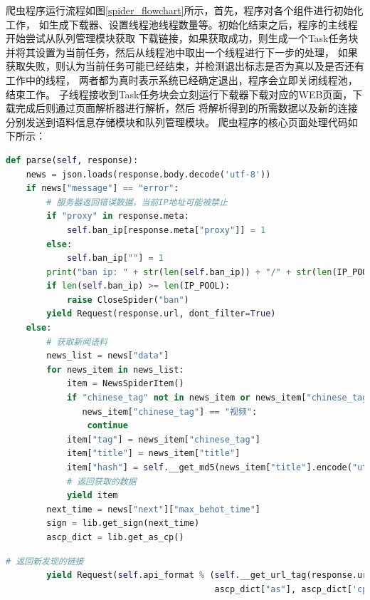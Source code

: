 爬虫程序运行流程如图\ref{spider_flowchart}所示，首先，程序对各个组件进行初始化工作，
如生成下载器、设置线程池线程数量等。初始化结束之后，程序的主线程开始尝试从队列管理模块获取
下载链接，如果获取成功，则生成一个Task任务块并将其设置为当前任务，然后从线程池中取出一个线程进行下一步的处理，
如果获取失败，则认为当前任务可能已经结束，并检测退出标志是否为真以及是否还有工作中的线程，
两者都为真时表示系统已经确定退出，程序会立即关闭线程池，结束工作。
子线程接收到Task任务块会立刻运行下载器下载对应的WEB页面，下载完成后则通过页面解析器进行解析，然后
将解析得到的所需数据以及新的连接分别发送到语料信息存储模块和队列管理模块。
爬虫程序的核心页面处理代码如下所示：
\begin{lstlisting}[language={Python},frame=shadowbox,rulesepcolor=\color{red!0!green!0!blue!0}] 
    def parse(self, response):
    news = json.loads(response.body.decode('utf-8'))
    if news["message"] == "error":
        # 服务器返回错误数据，当前IP地址可能被禁止
        if "proxy" in response.meta:
            self.ban_ip[response.meta["proxy"]] = 1
        else:
            self.ban_ip[""] = 1
        print("ban ip: " + str(len(self.ban_ip)) + "/" + str(len(IP_POOL)))
        if len(self.ban_ip) >= len(IP_POOL):
            raise CloseSpider("ban")
        yield Request(response.url, dont_filter=True)
    else:
        # 获取新闻语料
        news_list = news["data"]
        for news_item in news_list:
            item = NewsSpiderItem()
            if "chinese_tag" not in news_item or news_item["chinese_tag"] == "其他" or \
               news_item["chinese_tag"] == "视频":
                continue
            item["tag"] = news_item["chinese_tag"]
            item["title"] = news_item["title"]
            item["hash"] = self.__get_md5(news_item["title"].encode("utf-8"))
            # 返回获取的数据
            yield item
        next_time = news["next"]["max_behot_time"]
        sign = lib.get_sign(next_time)
        ascp_dict = lib.get_as_cp()
\end{lstlisting}
\begin{lstlisting}[language={Python},frame=shadowbox,rulesepcolor=\color{red!0!green!0!blue!0}] 
        # 返回新发现的链接
        yield Request(self.api_format % (self.__get_url_tag(response.url), next_time, next_time,
                                         ascp_dict["as"], ascp_dict['cp'], sign))
\end{lstlisting}
